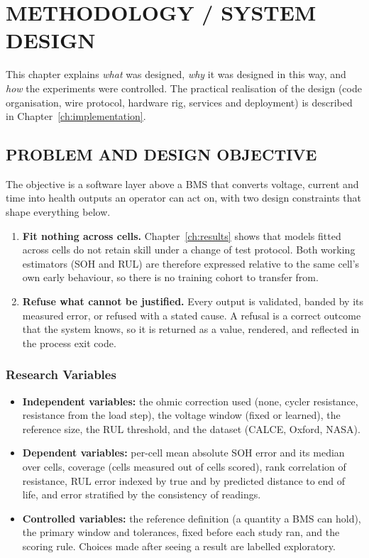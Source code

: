 \chapter{METHODOLOGY / SYSTEM DESIGN}
\label{ch:method}

This chapter explains \emph{what} was designed, \emph{why} it was designed in this way, and \emph{how} the experiments were controlled. The practical realisation of the design (code organisation, wire protocol, hardware rig, services and deployment) is described in Chapter~\ref{ch:implementation}.

\section{PROBLEM AND DESIGN OBJECTIVE}
\label{sec:problem}

The objective is a software layer above a BMS that converts voltage, current and time into health outputs an operator can act on, with two design constraints that shape everything below.

\begin{enumerate}
    \item \textbf{Fit nothing across cells.} Chapter~\ref{ch:results} shows that models fitted across cells do not retain skill under a change of test protocol. Both working estimators (SOH and RUL) are therefore expressed relative to the same cell's own early behaviour, so there is no training cohort to transfer from.
    \item \textbf{Refuse what cannot be justified.} Every output is validated, banded by its measured error, or refused with a stated cause. A refusal is a correct outcome that the system knows, so it is returned as a value, rendered, and reflected in the process exit code.
\end{enumerate}

\subsection{Research Variables}

\begin{itemize}
    \item \textbf{Independent variables:} the ohmic correction used (none, cycler resistance, resistance from the load step), the voltage window (fixed or learned), the reference size, the RUL threshold, and the dataset (CALCE, Oxford, NASA).
    \item \textbf{Dependent variables:} per-cell mean absolute SOH error and its median over cells, coverage (cells measured out of cells scored), rank correlation of resistance, RUL error indexed by true and by predicted distance to end of life, and error stratified by the consistency of readings.
    \item \textbf{Controlled variables:} the reference definition (a quantity a BMS can hold), the primary window and tolerances, fixed before each study ran, and the scoring rule. Choices made after seeing a result are labelled exploratory.
\end{itemize}


